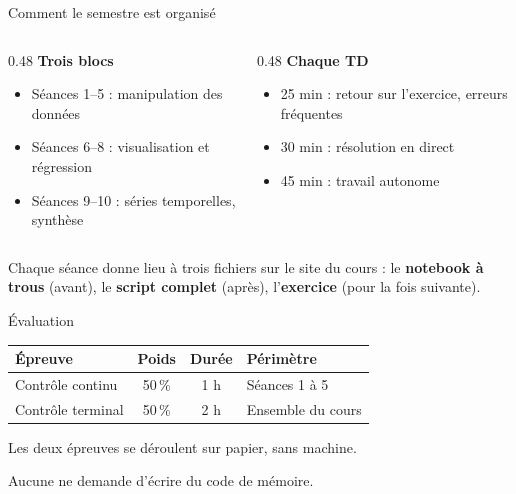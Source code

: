 \documentclass[10pt,aspectratio=169]{beamer}
\begin{document}
\begin{frame}{Comment le semestre est organisé}
\begin{columns}[T]
\begin{column}{0.48\textwidth}
\textbf{Trois blocs}
\begin{itemize}
  \item Séances 1--5 : manipulation des données
  \item Séances 6--8 : visualisation et régression
  \item Séances 9--10 : séries temporelles, synthèse
\end{itemize}
\end{column}
\begin{column}{0.48\textwidth}
\textbf{Chaque TD}
\begin{itemize}
  \item 25 min : retour sur l'exercice, erreurs fréquentes
  \item 30 min : résolution en direct
  \item 45 min : travail autonome
\end{itemize}
\end{column}
\end{columns}

\vspace{1.2em}
Chaque séance donne lieu à trois fichiers sur le site du cours : le \textbf{notebook à trous} (avant), le \textbf{script complet} (après), l'\textbf{exercice} (pour la fois suivante).
\end{frame}

\begin{frame}{Évaluation}
\begin{center}
\begin{tabular}{lccl}
\toprule
\textbf{Épreuve} & \textbf{Poids} & \textbf{Durée} & \textbf{Périmètre} \\
\midrule
Contrôle continu & 50\,\% & 1 h & Séances 1 à 5 \\
Contrôle terminal & 50\,\% & 2 h & Ensemble du cours \\
\bottomrule
\end{tabular}
\end{center}

\vspace{1.2em}
Les deux épreuves se déroulent \alert{sur papier, sans machine}.

\vspace{0.8em}
Aucune ne demande d'écrire du code de mémoire.
\end{frame}
\end{document}

